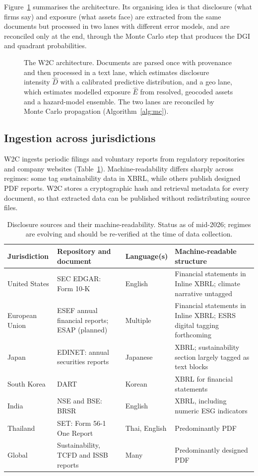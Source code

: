 \documentclass{article}
\theoremstyle{plain}
\theoremstyle{definition}
\begin{document}
Figure~\ref{fig:arch} summarises the architecture. Its organising idea is that disclosure (what firms say) and exposure (what assets face) are extracted from the same documents but processed in two lanes with different error models, and are reconciled only at the end, through the Monte Carlo step that produces the DGI and quadrant probabilities.

\begin{figure}[t]
  \centering
  
  \caption{The W2C architecture. Documents are parsed once with provenance and then processed in a text lane, which estimates disclosure intensity $\hat D$ with a calibrated predictive distribution, and a geo lane, which estimates modelled exposure $\hat E$ from resolved, geocoded assets and a hazard-model ensemble. The two lanes are reconciled by Monte Carlo propagation (Algorithm~\ref{alg:mc}).}
  \label{fig:arch}
\end{figure}

\subsection{Ingestion across jurisdictions}
W2C ingests periodic filings and voluntary reports from regulatory repositories and company websites (Table~\ref{tab:sources}). Machine-readability differs sharply across regimes: some tag sustainability data in XBRL, while others publish designed PDF reports. W2C stores a cryptographic hash and retrieval metadata for every document, so that extracted data can be published without redistributing source files.

\begin{table}[t]
\caption{Disclosure sources and their machine-readability. Status as of mid-2026; regimes are evolving and should be re-verified at the time of data collection.}
\label{tab:sources}
\centering
\small
\begin{tabularx}{\textwidth}{@{}l>{\raggedright\arraybackslash}p{4.3cm}l>{\raggedright\arraybackslash}X@{}}
\toprule
Jurisdiction & Repository and document & Language(s) & Machine-readable structure \\
\midrule
United States & SEC EDGAR: Form 10-K & English & Financial statements in Inline XBRL; climate narrative untagged \\
European Union & ESEF annual financial reports; ESAP (planned) & Multiple & Financial statements in Inline XBRL; ESRS digital tagging forthcoming \\
Japan & EDINET: annual securities reports & Japanese & XBRL; sustainability section largely tagged as text blocks \\
South Korea & DART & Korean & XBRL for financial statements \\
India & NSE and BSE: BRSR & English & XBRL, including numeric ESG indicators \\
Thailand & SET: Form 56-1 One Report & Thai, English & Predominantly PDF \\
Global & Sustainability, TCFD and ISSB reports & Many & Predominantly designed PDF \\
\bottomrule
\end{tabularx}
\end{table}
\end{document}
